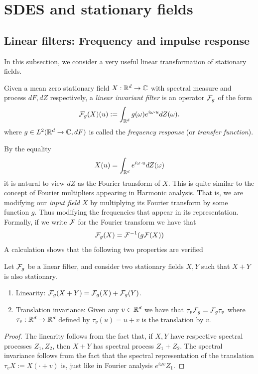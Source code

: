 \documentclass[
    a4paper,
    DIV=14,
    abstract=true,
    numbers=noenddot
]{scrartcl}
\begin{document}
\section{SDES and stationary fields}
\subsection{Linear filters: Frequency and impulse response}
In this subsection, we consider a very useful linear transformation of stationary fields.
\begin{definition}\label{frequency response def}
	Given a mean zero stationary field $X:\mathbb{R}^d\to\mathbb{C}$ with spectral measure and process  $dF,dZ$ respectively, a \emph{linear invariant filter} is an operator $\mathcal{F}_g$ of the form
	\begin{equation*}
		\mathcal{F}_g(X)(u):= \int_{\mathbb{R}^d} g(\omega)e^{i\omega\cdot u} dZ(\omega).
	\end{equation*}
	where $g \in L^2(\mathbb{R}^d\to\mathbb{C},dF)$ is called the \emph{frequency response} (or \emph{transfer function}).
\end{definition}
By the equality
\begin{equation*}
	X(u)=\int_{\mathbb{R}^d}e^{i\omega\cdot u}dZ(\omega)
\end{equation*}
it is natural to view $dZ$ as the Fourier transform of $X$. This is quite similar to the concept of Fourier multipliers appearing in Harmonic analysis. That is, we are modifying our \emph{input field} $X$ by multiplying its Fourier transform by some function $g$. Thus modifying the frequencies that appear in its representation. Formally, if we write  $\mathcal{F}$ for the Fourier transform we have that
\begin{equation}\label{formal}
	\mathcal{F}_g(X)=\mathcal{F}^{-1}(g\mathcal{F}(X))
\end{equation}
A calculation shows that the following two properties are verified
\begin{lemma}
	Let $\mathcal{F}_g$ be a linear filter, and consider two stationary fields $X, Y$ such that $X+Y$ is also stationary.
	\begin{enumerate}
		\item Linearity: $\mathcal{F}_g(X+Y)=\mathcal{F}_g(X)+\mathcal{F}_g(Y)$.
		\item Translation invariance: Given any $v\in \mathbb{R}^d$ we have that  $\tau_v\mathcal{F}_g= \mathcal{F}_g\tau_v$ where $\tau_v:\mathbb{R}^d\to \mathbb{R}^d$ defined by $\tau_v(u)=u+v$ is the translation by $v$.
	\end{enumerate}
\end{lemma}
\begin{proof}
	The linearity follows from the fact that, if $X, Y$ have respective spectral processes  $Z_1, Z_2$, then  $X+Y$ has spectral process  $Z_1+Z_2$. The spectral invariance follows from the fact that the spectral representation of  the translation $\tau_v X:= X(\cdot +v)$ is, just like in Fourier analysis $e^{i\omega v}Z_1$.
\end{proof}
\end{document}

